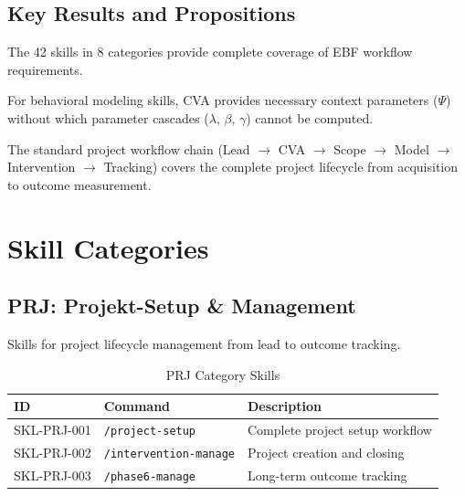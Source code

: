 
\subsection{Key Results and Propositions}
\label{sec:sk-results}

\begin{proposition}
The 42 skills in 8 categories provide complete coverage of EBF workflow requirements.
\end{proposition}

\begin{proposition}
For behavioral modeling skills, CVA provides necessary context parameters ($\Psi$) without which
parameter cascades ($\lambda$, $\beta$, $\gamma$) cannot be computed.
\end{proposition}

\begin{proposition}
The standard project workflow chain (Lead $\rightarrow$ CVA $\rightarrow$ Scope $\rightarrow$ Model $\rightarrow$ Intervention $\rightarrow$ Tracking)
covers the complete project lifecycle from acquisition to outcome measurement.
\end{proposition}


\section{Skill Categories}
\label{sec:sk-categories}

\subsection{PRJ: Projekt-Setup \& Management}

Skills for project lifecycle management from lead to outcome tracking.

\begin{table}[h]
\centering
\begin{tabular}{|l|l|l|}
\hline
\textbf{ID} & \textbf{Command} & \textbf{Description} \\
\hline
SKL-PRJ-001 & \texttt{/project-setup} & Complete project setup workflow \\
SKL-PRJ-002 & \texttt{/intervention-manage} & Project creation and closing \\
SKL-PRJ-003 & \texttt{/phase6-manage} & Long-term outcome tracking \\
\hline
\end{tabular}
\caption{PRJ Category Skills}
\end{table}

